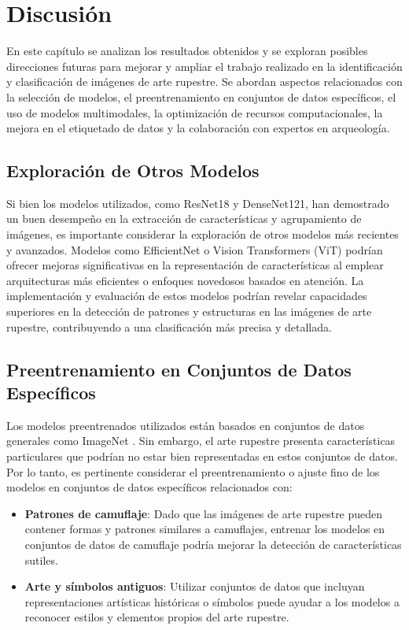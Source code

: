\chapter{Discusión}

En este capítulo se analizan los resultados obtenidos y se exploran posibles direcciones futuras para mejorar y ampliar el trabajo realizado en la identificación y clasificación de imágenes de arte rupestre. Se abordan aspectos relacionados con la selección de modelos, el preentrenamiento en conjuntos de datos específicos, el uso de modelos multimodales, la optimización de recursos computacionales, la mejora en el etiquetado de datos y la colaboración con expertos en arqueología.

\section{Exploración de Otros Modelos}

Si bien los modelos utilizados, como ResNet18 y DenseNet121, han demostrado un buen desempeño en la extracción de características y agrupamiento de imágenes, es importante considerar la exploración de otros modelos más recientes y avanzados. Modelos como EfficientNet \cite{tan2019efficientnet} o Vision Transformers (ViT) \cite{dosovitskiy2020image} podrían ofrecer mejoras significativas en la representación de características al emplear arquitecturas más eficientes o enfoques novedosos basados en atención.
La implementación y evaluación de estos modelos podrían revelar capacidades superiores en la detección de patrones y estructuras en las imágenes de arte rupestre, contribuyendo a una clasificación más precisa y detallada.

\section{Preentrenamiento en Conjuntos de Datos Específicos}

Los modelos preentrenados utilizados están basados en conjuntos de datos generales como ImageNet \cite{deng2009imagenet}. Sin embargo, el arte rupestre presenta características particulares que podrían no estar bien representadas en estos conjuntos de datos. Por lo tanto, es pertinente considerar el preentrenamiento o ajuste fino de los modelos en conjuntos de datos específicos relacionados con:

\begin{itemize}
    \item \textbf{Patrones de camuflaje}: Dado que las imágenes de arte rupestre pueden contener formas y patrones similares a camuflajes, entrenar los modelos en conjuntos de datos de camuflaje podría mejorar la detección de características sutiles.
    \item \textbf{Arte y símbolos antiguos}: Utilizar conjuntos de datos que incluyan representaciones artísticas históricas o símbolos puede ayudar a los modelos a reconocer estilos y elementos propios del arte rupestre.
\end{itemize}

